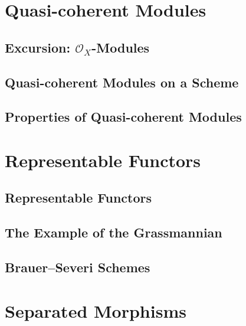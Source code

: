\documentclass[11pt, a4paper]{article}
\begin{document}
\section{Quasi-coherent Modules}

\subsection{Excursion: $\mathcal{O}_X$-Modules}

\subsection{Quasi-coherent Modules on a Scheme}

\subsection{Properties of Quasi-coherent Modules}

\section{Representable Functors}

\subsection{Representable Functors}

\subsection{The Example of the Grassmannian}

\subsection{Brauer--Severi Schemes}

\section{Separated Morphisms}
\end{document}
